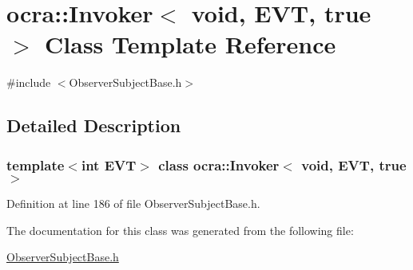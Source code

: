 \hypertarget{classocra_1_1Invoker_3_01void_00_01EVT_00_01true_01_4}{}\section{ocra\+:\+:Invoker$<$ void, E\+VT, true $>$ Class Template Reference}
\label{classocra_1_1Invoker_3_01void_00_01EVT_00_01true_01_4}


{\ttfamily \#include $<$Observer\+Subject\+Base.\+h$>$}



\subsection{Detailed Description}
\subsubsection*{template$<$int E\+VT$>$\newline
class ocra\+::\+Invoker$<$ void, E\+V\+T, true $>$}



Definition at line 186 of file Observer\+Subject\+Base.\+h.



The documentation for this class was generated from the following file\+:\begin{DoxyCompactItemize}
\item 
\hyperlink{ObserverSubjectBase_8h}{Observer\+Subject\+Base.\+h}\end{DoxyCompactItemize}
